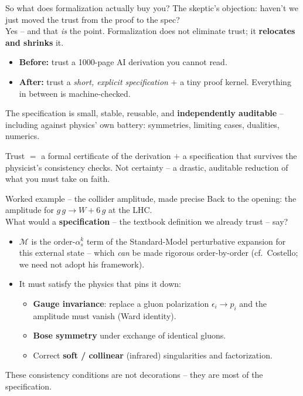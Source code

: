 \documentclass[aspectratio=169,xcolor=dvipsnames]{beamer}
\def\p{\\[0.1in] \pause}
\begin{document}
\begin{frame}{So what does formalization actually buy you?}
The skeptic's objection: haven't we just moved the trust from the proof to the spec? \p
\pause
Yes -- and that \emph{is} the point.  Formalization does not eliminate trust; it
\textbf{relocates and shrinks} it.
\begin{itemize}
  \item \textbf{Before:} trust a 1000-page AI derivation you cannot read.
  \item \textbf{After:} trust a \emph{short, explicit specification} $+$ a tiny proof kernel.
        Everything in between is machine-checked.
\end{itemize} \pause
\smallskip
The specification is small, stable, reusable, and \textbf{independently auditable} -- including
against physics' own battery: symmetries, limiting cases, dualities, numerics. \pause
\begin{block}{}
Trust $=$ a formal certificate of the derivation $+$ a specification that survives the
physicist's consistency checks.  Not certainty -- a drastic, auditable reduction of what
you must take on faith.
\end{block}
\end{frame}

\begin{frame}{Worked example -- the collider amplitude, made precise}
Back to the opening: the amplitude for $g\,g \to W + 6\,g$ at the LHC. \p
\pause
What would a \textbf{specification} -- the textbook definition we already trust -- say?
\begin{itemize}
  \item $\mathcal{M}$ is the order-$\alpha_s^{k}$ term of the Standard-Model perturbative
        expansion for this external state -- which \emph{can} be made rigorous order-by-order
        (cf.\ Costello; we need not adopt his framework).
  \item It must satisfy the physics that pins it down:
  \begin{itemize}
    \item \textbf{Gauge invariance}: replace a gluon polarization $\epsilon_i \to p_i$ and
          the amplitude must vanish (Ward identity).
    \item \textbf{Bose symmetry} under exchange of identical gluons.
    \item Correct \textbf{soft / collinear} (infrared) singularities and factorization.
  \end{itemize}
\end{itemize} \pause
\smallskip
These consistency conditions are not decorations -- they are most of the specification.
\end{frame}
\end{document}
